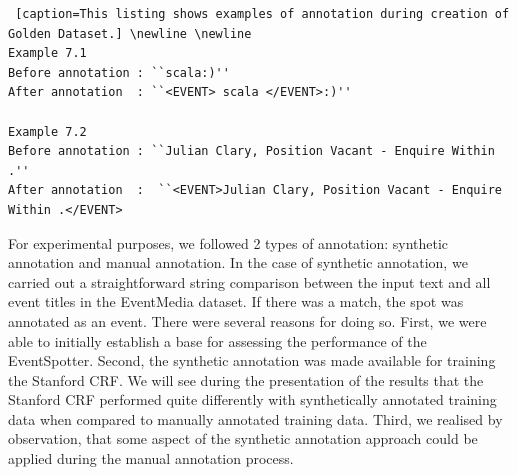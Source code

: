 \documentclass[a4paper,11pt]{report}
\begin{document}
\begin{lstlisting} [caption=This listing shows examples of annotation during creation of Golden Dataset.] \newline \newline 
Example 7.1
Before annotation : ``scala:)'' 
After annotation  : ``<EVENT> scala </EVENT>:)'' 

Example 7.2
Before annotation : ``Julian Clary, Position Vacant - Enquire Within .'' 
After annotation  :  ``<EVENT>Julian Clary, Position Vacant - Enquire Within .</EVENT>
\end{lstlisting} \newline \newline

For experimental purposes, we followed 2 types of annotation: synthetic annotation and manual annotation.
In the case of synthetic annotation, we carried out a straightforward string comparison between the input text and all event titles in the EventMedia dataset. If there was a match, the spot was annotated as an event. There were several reasons for doing so. First, we were able to initially establish a base for assessing the performance of the EventSpotter. Second, the synthetic annotation was made available for training the Stanford CRF. We will see during the presentation of the results that the Stanford CRF performed quite differently with synthetically annotated training data when compared to manually annotated training data. Third, we realised by observation, that some aspect of the synthetic annotation approach could be applied during the manual annotation process.
\end{document}
